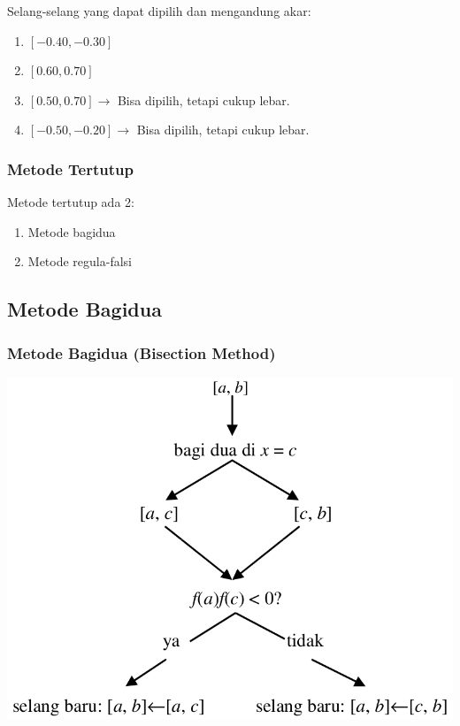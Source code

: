 \documentclass[pdflatex,compress]{beamer}
\begin{document}
\begin{frame}
\begin{multicols}{2}
\begin{center}
	\end{center}
	\columnbreak
	Selang-selang yang dapat dipilih dan mengandung akar:
	\begin{enumerate}
		\item $ [-0.40, -0.30] $
		\item $ [0.60, 0.70] $
		\item $ [0.50, 0.70] \rightarrow $ Bisa dipilih, tetapi cukup lebar.
		\item $ [-0.50, -0.20] \rightarrow $ Bisa dipilih, tetapi cukup lebar.
	\end{enumerate}			
	\end{multicols}
\end{frame}

\begin{frame}
	\frametitle{Metode Tertutup}
	Metode tertutup ada 2:
	\begin{enumerate}
		\item Metode bagidua
		\item Metode regula-falsi
	\end{enumerate}
\end{frame}

\subsection{Metode Bagidua}

\begin{frame}
	\frametitle{Metode Bagidua (Bisection Method)}
	\begin{center}
		\includegraphics[width=0.7\linewidth]{img/img05.png}
	\end{center}
\end{frame}
\end{document}
